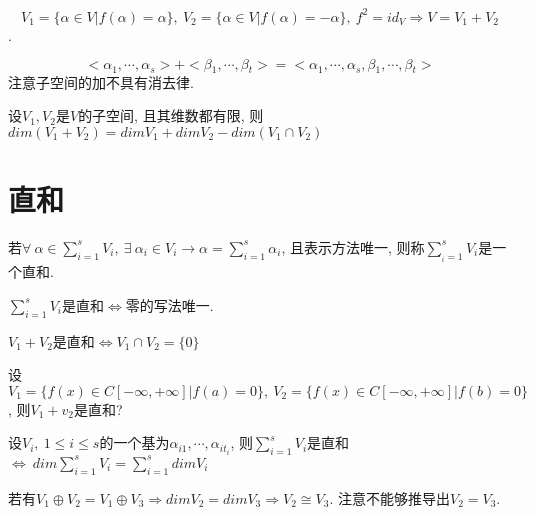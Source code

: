 \begin{example}
    \[ V_1=\{\alpha \in V|f(\alpha)=\alpha\},\ V_2=\{\alpha \in V|f(\alpha)=-\alpha\},\ f^2=id_V\Longrightarrow V=V_1+V_2 \].
\end{example}

\begin{statement}
    \[<\alpha{_1}, \cdots, \alpha{_s}>+<\beta{_1}, \cdots, \beta{_t}>=<\alpha{_1}, \cdots, \alpha{_s}, \beta{_1}, \cdots, \beta{_t}>\]
    注意子空间的加不具有消去律.
\end{statement}

\begin{theorem}[子空间的维数公式]
    设$V_1, V_2$是$V$的子空间, 且其维数都有限, 则$dim(V_1+V_2)=dimV_1+dimV_2-dim(V_1\cap V_2)$
\end{theorem}

\section{ 直和 }

\begin{definition}[直和]
    若$\forall \ \alpha \in \sum^s_{i=1}V_i, \ \exists \ \alpha{_i}\in V_i\to \alpha = \sum^s_{i=1}\alpha{_i}$, 且表示方法唯一, 则称$\sum^s_{_i=1}V_i$是一个直和.
\end{definition}

\begin{inference}
    $\sum^s_{i=1}V_i$是直和$\Longleftrightarrow$零的写法唯一.
\end{inference}

\begin{statement}
    $V_1+V_2$是直和$\Longleftrightarrow V_1\cap V_2=\{0\}$
\end{statement}

\begin{example}
    设$V_1=\{f(x)\in C[-\infty, +\infty]|f(a)=0\}, \ V_2=\{f(x)\in C[-\infty, +\infty]|f(b)=0\}$, 则$V_1+v_2$是直和?
\end{example}

\begin{theorem}
    设$V_i, \ 1\le i \le s$的一个基为$\alpha{_{i1}}, \cdots, \alpha{_{it_i}}$, 则$\sum^s_{i=1}V_i$是直和$\Longleftrightarrow\ dim\sum^s_{i=1}V_i=\sum^s_{i=1}dimV_i$
\end{theorem}

\begin{example}
    若有$V_1\oplus V_2=V_1 \oplus V_3\Longrightarrow dimV_2=dimV_3\Longrightarrow V_2\cong V_3$.
    注意不能够推导出$V_2=V_3$.
\end{example}

